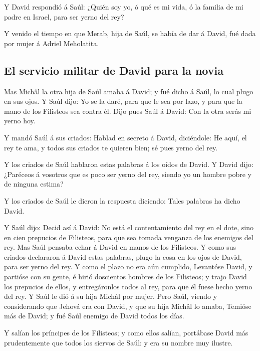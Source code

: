  Y David respondió á Saúl: ¿Quién soy yo, ó qué es mi vida,
ó la familia de mi padre en Israel, para ser yerno del rey?

 Y venido el tiempo en que Merab, hija de Saúl, se había de
dar á David, fué dada por mujer á Adriel Meholatita.

\hypertarget{el-servicio-militar-de-david-para-la-novia}{%
\subsection{El servicio militar de David para la
novia}\label{el-servicio-militar-de-david-para-la-novia}}

 Mas Michâl la otra hija de Saúl amaba á David; y fué dicho
á Saúl, lo cual plugo en sus ojos.  Y Saúl dijo: Yo se la
daré, para que le sea por lazo, y para que la mano de los Filisteos sea
contra él. Dijo pues Saúl á David: Con la otra serás mi yerno hoy.

 Y mandó Saúl á sus criados: Hablad en secreto á David,
diciéndole: He aquí, el rey te ama, y todos sus criados te quieren bien;
sé pues yerno del rey.

 Y los criados de Saúl hablaron estas palabras á los oídos
de David. Y David dijo: ¿Paréceos á vosotros que es poco ser yerno del
rey, siendo yo un hombre pobre y de ninguna estima?

 Y los criados de Saúl le dieron la respuesta diciendo:
Tales palabras ha dicho David.

 Y Saúl dijo: Decid así á David: No está el contentamiento
del rey en el dote, sino en cien prepucios de Filisteos, para que sea
tomada venganza de los enemigos del rey. Mas Saúl pensaba echar á David
en manos de los Filisteos.  Y como sus criados declararon á
David estas palabras, plugo la cosa en los ojos de David, para ser yerno
del rey. Y como el plazo no era aún cumplido,  Levantóse
David, y partióse con su gente, é hirió doscientos hombres de los
Filisteos; y trajo David los prepucios de ellos, y entregáronlos todos
al rey, para que él fuese hecho yerno del rey. Y Saúl le dió á su hija
Michâl por mujer.  Pero Saúl, viendo y considerando que
Jehová era con David, y que su hija Michâl lo amaba, 
Temióse más de David; y fué Saúl enemigo de David todos los días.

 Y salían los príncipes de los Filisteos; y como ellos
salían, portábase David más prudentemente que todos los siervos de Saúl:
y era su nombre muy ilustre.


